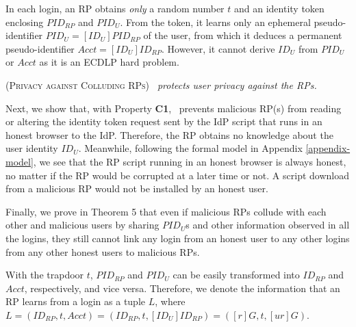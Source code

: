 In each login, an RP obtains \emph{only} a random number $t$ and an identity token enclosing $PID_{RP}$ and $PID_U$. From the token, it learns only an ephemeral pseudo-identifier $PID_{U} = [{ID_U}]{PID_{RP}}$ of the user, from which it deduces a permanent pseudo-identifier $Acct = [ID_U]ID_{RP}$. However, it cannot derive $ID_U$ from $PID_{U}$ or $Acct$ as it is an ECDLP hard problem.

\begin{thm}
\textsc{(Privacy against Colluding RPs)} \emph{\usso\ protects user privacy against the RPs.}
\label{them-rp-unlinkability}
\end{thm}

Next, we show that, with Property {\bf C1}, \usso\ prevents malicious RP(s) from reading or altering the identity token request sent by the IdP script that runs in an honest browser to the IdP. Therefore, the RP obtains no knowledge about the user identity $ID_U$. Meanwhile, following the formal model in Appendix \ref{appendix-model}, we see that the RP script running in an honest browser is always honest, no matter if the RP would be corrupted at a later time or not. A script download from a malicious RP would not be installed by an honest user. 

Finally, we prove in Theorem 5 that even if malicious RPs collude with each other and malicious users by sharing $PID_U$s and other information observed in all the logins, they still cannot link any login from an honest user to any other logins from any other honest users to malicious RPs.




With the trapdoor $t$, $PID_{RP}$ and $PID_U$ can be easily transformed into $ID_{RP}$ and $Acct$, respectively, and vice versa. Therefore, we denote the information that an RP learns from a login as a tuple $L$, where $L =(ID_{RP}, t, Acct)=(ID_{RP}, t, [ID_{U}]ID_{RP})=([r]G, t, [ur]G)$.



